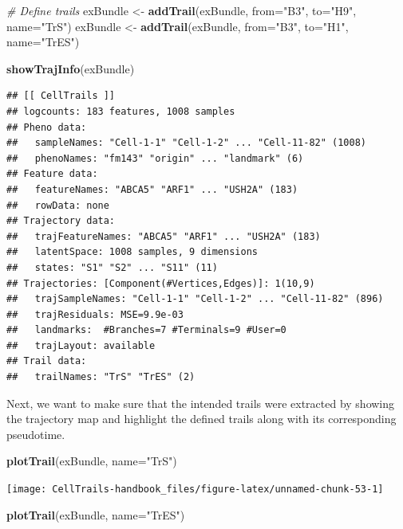 \documentclass[]{book}
\newenvironment{Shaded}{\begin{snugshade}}{\end{snugshade}}
\newcommand{\KeywordTok}[1]{\textcolor[rgb]{0.13,0.29,0.53}{\textbf{#1}}}
\newcommand{\DataTypeTok}[1]{\textcolor[rgb]{0.13,0.29,0.53}{#1}}
\newcommand{\StringTok}[1]{\textcolor[rgb]{0.31,0.60,0.02}{#1}}
\newcommand{\CommentTok}[1]{\textcolor[rgb]{0.56,0.35,0.01}{\textit{#1}}}
\newcommand{\NormalTok}[1]{#1}
\theoremstyle{definition}
\theoremstyle{definition}
\theoremstyle{definition}
\theoremstyle{remark}
\begin{document}
\begin{Shaded}
\begin{Highlighting}[]
\CommentTok{# Define trails}
\NormalTok{exBundle <-}\StringTok{ }\KeywordTok{addTrail}\NormalTok{(exBundle, }\DataTypeTok{from=}\StringTok{"B3"}\NormalTok{, }\DataTypeTok{to=}\StringTok{"H9"}\NormalTok{, }\DataTypeTok{name=}\StringTok{"TrS"}\NormalTok{)}
\NormalTok{exBundle <-}\StringTok{ }\KeywordTok{addTrail}\NormalTok{(exBundle, }\DataTypeTok{from=}\StringTok{"B3"}\NormalTok{, }\DataTypeTok{to=}\StringTok{"H1"}\NormalTok{, }\DataTypeTok{name=}\StringTok{"TrES"}\NormalTok{)}

\KeywordTok{showTrajInfo}\NormalTok{(exBundle)}
\end{Highlighting}
\end{Shaded}

\begin{verbatim}
## [[ CellTrails ]] 
## logcounts: 183 features, 1008 samples
## Pheno data: 
##   sampleNames: "Cell-1-1" "Cell-1-2" ... "Cell-11-82" (1008)
##   phenoNames: "fm143" "origin" ... "landmark" (6)
## Feature data: 
##   featureNames: "ABCA5" "ARF1" ... "USH2A" (183)
##   rowData: none
## Trajectory data: 
##   trajFeatureNames: "ABCA5" "ARF1" ... "USH2A" (183)
##   latentSpace: 1008 samples, 9 dimensions
##   states: "S1" "S2" ... "S11" (11)
## Trajectories: [Component(#Vertices,Edges)]: 1(10,9)
##   trajSampleNames: "Cell-1-1" "Cell-1-2" ... "Cell-11-82" (896)
##   trajResiduals: MSE=9.9e-03
##   landmarks:  #Branches=7 #Terminals=9 #User=0
##   trajLayout: available
## Trail data: 
##   trailNames: "TrS" "TrES" (2)
\end{verbatim}

Next, we want to make sure that the intended trails were extracted by
showing the trajectory map and highlight the defined trails along with
its corresponding pseudotime.

\begin{Shaded}
\begin{Highlighting}[]
\KeywordTok{plotTrail}\NormalTok{(exBundle, }\DataTypeTok{name=}\StringTok{"TrS"}\NormalTok{)}
\end{Highlighting}
\end{Shaded}

\texttt{[image: CellTrails-handbook\_files/figure-latex/unnamed-chunk-53-1]}

\begin{Shaded}
\begin{Highlighting}[]
\KeywordTok{plotTrail}\NormalTok{(exBundle, }\DataTypeTok{name=}\StringTok{"TrES"}\NormalTok{)}
\end{Highlighting}
\end{Shaded}
\end{document}
